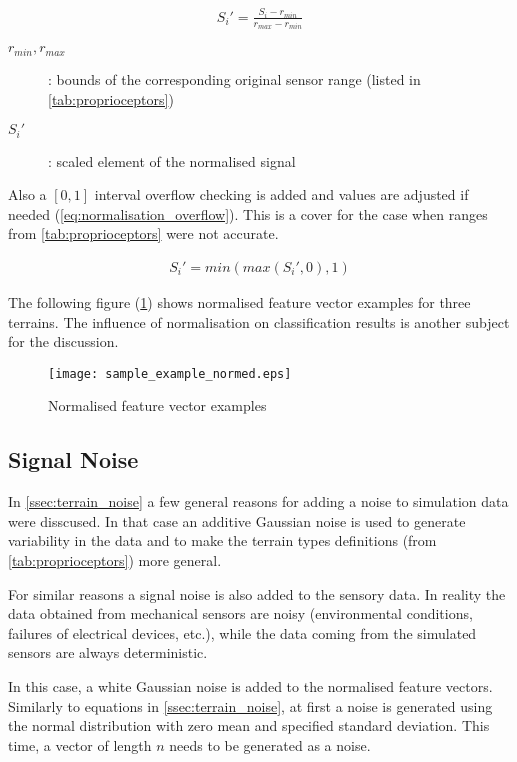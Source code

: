 \begin{align} \label{eq:normalisation}
S_i' = \frac{S_i - r_{min}}{r_{max} - r_{min}} 
\end{align}

\begin{description}
\item[$ r_{min}, r_{max} $] : bounds of the corresponding original sensor range (listed in \cref{tab:proprioceptors})
\item[$ S_i' $] : scaled element of the normalised signal
\end{description}

Also a $ [0, 1] $ interval overflow checking is added and values are adjusted if needed (\cref{eq:normalisation_overflow}). This is a cover for the case when ranges from \cref{tab:proprioceptors} were not accurate.

\begin{align} \label{eq:normalisation_overflow}
S_i' = min(max(S_i', 0), 1)
\end{align}

The following figure (\ref{fig:sample_example_normed}) shows normalised feature vector examples for three terrains. The influence of normalisation on classification results is another subject for the discussion.

\begin{figure}[H]
  \centering
  \texttt{[image: sample\_example\_normed.eps]}
  \caption{Normalised feature vector examples}
  \label{fig:sample_example_normed}
\end{figure}

\subsection{Signal Noise} \label{ssec:signal_noise}
In \cref{ssec:terrain_noise} a few general reasons for adding a noise to simulation data were disscused. In that case an additive Gaussian noise is used to generate variability in the data and to make the terrain types definitions (from \cref{tab:proprioceptors}) more general.

For similar reasons a signal noise is also added to the sensory data. In reality the data obtained from mechanical sensors are noisy (environmental conditions, failures of electrical devices, etc.), while the data coming from the simulated sensors are always deterministic.

In this case, a white Gaussian noise is added to the normalised feature vectors. Similarly to equations in \cref{ssec:terrain_noise}, at first a noise is generated using the normal distribution with zero mean and specified standard deviation. This time, a vector of length $ n $ needs to be generated as a noise.

